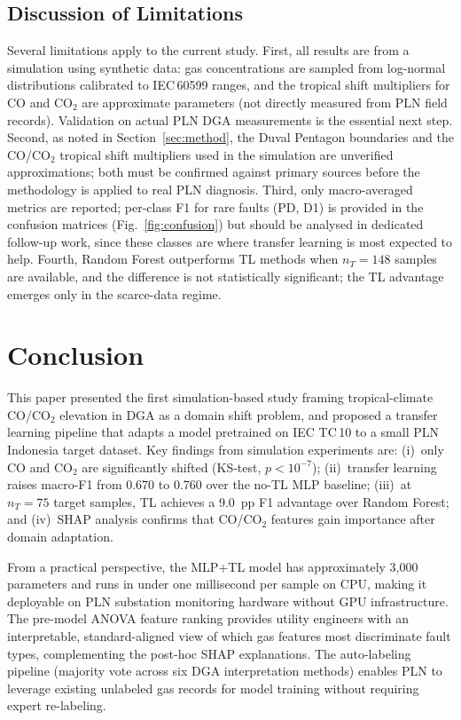 \documentclass[conference]{IEEEtran}
\begin{document}
\subsection{Discussion of Limitations}
\label{sec:limits}
Several limitations apply to the current study.
First, all results are from a simulation using synthetic data:
gas concentrations are sampled from log-normal distributions
calibrated to IEC\,60599 ranges, and the tropical shift multipliers
for CO and CO$_2$ are approximate parameters (not directly
measured from PLN field records).
Validation on actual PLN DGA measurements is the essential next step.
Second, as noted in Section~\ref{sec:method}, the Duval Pentagon
boundaries and the CO/CO$_2$ tropical shift multipliers used in
the simulation are unverified approximations; both must be
confirmed against primary sources before the methodology is applied
to real PLN diagnosis.
Third, only macro-averaged metrics are reported; per-class F1 for
rare faults (PD, D1) is provided in the confusion matrices
(Fig.~\ref{fig:confusion}) but should be analysed in dedicated
follow-up work, since these classes are where transfer learning
is most expected to help.
Fourth, Random Forest outperforms TL methods when $n_T = 148$ samples
are available, and the difference is not statistically significant;
the TL advantage emerges only in the scarce-data regime.

\section{Conclusion}
\label{sec:conclusion}

This paper presented the first simulation-based study framing
tropical-climate CO/CO$_2$ elevation in DGA as a domain shift
problem, and proposed a transfer learning pipeline that adapts
a model pretrained on IEC TC\,10 to a small PLN Indonesia target
dataset.
Key findings from simulation experiments are:
(i)~only CO and CO$_2$ are significantly shifted (KS-test, $p < 10^{-7}$);
(ii)~transfer learning raises macro-F1 from 0.670 to 0.760 over the
no-TL MLP baseline;
(iii)~at $n_T = 75$ target samples, TL achieves a 9.0~pp F1 advantage
over Random Forest; and
(iv)~SHAP analysis confirms that CO/CO$_2$ features gain importance
after domain adaptation.

From a practical perspective, the MLP+TL model has approximately
3{,}000 parameters and runs in under one millisecond per sample on
CPU, making it deployable on PLN substation monitoring hardware
without GPU infrastructure.
The pre-model ANOVA feature ranking provides utility engineers with
an interpretable, standard-aligned view of which gas features
most discriminate fault types, complementing the post-hoc SHAP
explanations.
The auto-labeling pipeline (majority vote across six DGA
interpretation methods) enables PLN to leverage existing unlabeled
gas records for model training without requiring expert re-labeling.
\end{document}
